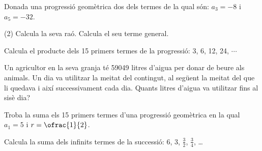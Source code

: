 \begin{mylist}
\exer[1]  Donada una progressió geomètrica dos dels termes de la qual són: $a_{3} = -8$ i $a_{5} = -32$. 
\begin{tasks}(2)
	\task   Calcula la seva raó.   \task Calcula el seu terme general.
\end{tasks}

\begin{comment}
\exer  Certa classe d'alga, anomenada \textit{clorella}, es reprodueix duplicant la seva quantitat cada dues hores i mitja. Al cap d'altres dues hores i mitja torna a duplicar la seva quantitat, i així successivament. Si es té en el moment inicial un quilo, al cap de dues hores i mitja hi ha dos quilos.


 a) Fes una taula de valors en la qual indiquis per a cada període de reproducció el nombre de quilos de \textit{clorella}.

 b) Indica el terme general.

 c) Al cap de 4 dies, han transcorregut 40 períodes, consideres possible aquest creixement? 
\end{comment}

\exer  Calcula el producte dels 15 primers termes de la progressió: 3, 6, 12, 24, $\cdots$


\exer  Un agricultor en la seva granja té 59049 litres d'aigua per donar de beure als animals. Un dia va utilitzar la meitat del contingut, al següent la meitat del que li quedava i així successivament cada dia. Quants litres d'aigua va utilitzar fins al sisè dia?

\exer[1]  Troba la suma els 15 primers termes d'una progressió geomètrica en la qual $a_{1} = 5$  i $r = \ofrac{1}{2}$.

\exer[1]  Calcula la suma dels infinits termes de la successió: 6, 3, $\frac{3}{2}$, $\frac{3}{4}$, {\dots}


\end{mylist}
